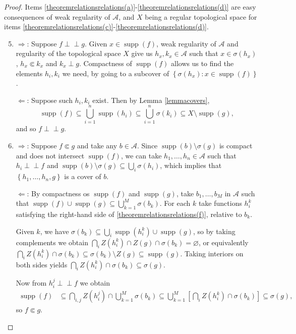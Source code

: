 \documentclass[letter,11pt]{amsart}
\theoremstyle{plain}		\newtheorem{theorem}[generalnumbering]{Theorem}
\theoremstyle{plain}		\newtheorem{corollary}[generalnumbering]{Corollary}
\theoremstyle{definition}		\newtheorem{definition}[generalnumbering]{Definition}
\theoremstyle{definition}		\newtheorem{example}[generalnumbering]{Example}
\theoremstyle{plain}		\newtheorem{proposition}[generalnumbering]{Proposition}
\theoremstyle{plain}		\newtheorem{lemma}[generalnumbering]{Lemma}
\theoremstyle{plain}    \newtheorem{plainstyle}[generalnumbering]{\namefordifferentenvironment}
\theoremstyle{plain}    \newtheorem*{plainstyle*}{\namefordifferentenvironment}
\theoremstyle{definition}    \newtheorem{definitionstyle}[generalnumbering]{\namefordifferentenvironment}
\theoremstyle{definition}    \newtheorem*{definitionstyle*}{\namefordifferentenvironment}
\newcommand{\perpp}{\perp\!\!\!\perp}
\DeclareMathOperator{\supp}{supp}
\begin{document}
\begin{proof}
	Items \ref{theoremrelationsrelations(a)}-\ref{theoremrelationsrelations(d)} are easy consequences of weak regularity of $\mathcal{A}$, and $X$ being a regular topological space for items \ref{theoremrelationsrelations(c)}-\ref{theoremrelationsrelations(d)}.
	\begin{enumerate}[label=(\alph*)]\setcounter{enumi}{4}
		\item $\Rightarrow$: Suppose $f\perpp g$. Given $x\in \supp(f)$, weak regularity of $\mathcal{A}$ and regularity of the topological space $X$ give us $h_x,k_x\in\mathcal{A}$ such that $x\in\sigma(h_x)$, $h_x\Subset k_x$ and $k_x\perp g$. Compactness of $\supp(f)$ allows us to find the elements $h_i,k_i$ we need, by going to a subcover of $\left\{\sigma(h_x):x\in\supp(f)\right\}$.
		
		$\Leftarrow$: Suppose such $h_i,k_i$ exist. Then by Lemma \ref{lemmacovers},
		\[\supp(f)\subseteq\bigcup_{i=1}^n\supp(h_i)\subseteq\bigcup_{i=1}^n\sigma(k_i)\subseteq X\setminus\supp(g),\]
		and so $f\perpp g$.
		\item $\Rightarrow$: Suppose $f\Subset g$ and take any $b\in\mathcal{A}$. Since $\supp(b)\setminus\sigma(g)$ is compact and does not intersect $\supp(f)$, we can take $h_1,\ldots,h_n\in\mathcal{A}$ such that $h_i\perpp f$ and $\supp(b)\setminus\sigma(g)\subseteq\bigcup_i\sigma(h_i)$, which implies that $\left\{h_1,\ldots,h_n,g\right\}$ is a cover of $b$.
		
		$\Leftarrow$: By compactness os $\supp(f)$ and $\supp(g)$, take $b_1,\ldots,b_M$ in $\mathcal{A}$ such that $\supp(f)\cup\supp(g)\subseteq\bigcup_{k=1}^M\sigma(b_k)$. For each $k$ take functions $h_i^k$ satisfying the right-hand side of \ref{theoremrelationsrelations(f)}, relative to $b_k$.
		
		Given $k$, we have $\sigma(b_k)\subseteq\bigcup_i\supp(h_i^k)\cup\supp(g)$, so by taking complements we obtain $\bigcap_iZ(h_i^k)\cap Z(g)\cap\sigma(b_k)=\varnothing$, or equivalently $\bigcap_iZ(h_i^k)\cap\sigma(b_k)\subseteq\sigma(b_k)\setminus Z(g)\subseteq\supp(g)$. Taking interiors on both sides yields $\bigcap_iZ(h_i^k)\cap\sigma(b_k)\subseteq\sigma(g)$.
		
		Now from $h_i^j\perpp f$ we obtain
		\begin{align*}
		\supp(f)&\subseteq\bigcap_{i,j}Z(h_i^j)\cap\bigcup_{k=1}^M\sigma(b_k)\subseteq\bigcup_{k=1}^M\left[\bigcap_i Z(h_i^k)\cap\sigma(b_k)\right]\subseteq \sigma(g),
		\end{align*}
		so $f\Subset g$.\qedhere
	\end{enumerate}
\end{proof}
\end{document}
